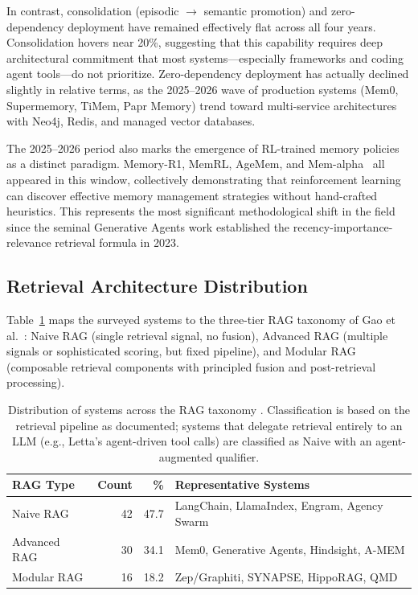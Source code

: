 In contrast, consolidation (episodic $\to$ semantic promotion) and
zero-dependency deployment have remained effectively flat across all four
years. Consolidation hovers near 20\%, suggesting that this capability
requires deep architectural commitment that most systems---especially
frameworks and coding agent tools---do not prioritize. Zero-dependency
deployment has actually declined slightly in relative terms, as the
2025--2026 wave of production systems (Mem0, Supermemory, TiMem, Papr
Memory) trend toward multi-service architectures with Neo4j, Redis, and
managed vector databases.

The 2025--2026 period also marks the emergence of RL-trained memory
policies as a distinct paradigm. Memory-R1, MemRL, AgeMem, and
Mem-alpha~\cite{wang2025memalpha} all appeared in this window, collectively
demonstrating that reinforcement learning can discover effective memory
management strategies without hand-crafted heuristics. This represents the
most significant methodological shift in the field since the seminal
Generative Agents work \cite{park2023generative} established the
recency-importance-relevance retrieval formula in 2023.

\subsection{Retrieval Architecture Distribution}
\label{sec:rag-distribution}

Table~\ref{tab:rag-distribution} maps the surveyed systems to the three-tier
RAG taxonomy of Gao et al.~\cite{gao2023rag}: Naive RAG (single retrieval
signal, no fusion), Advanced RAG (multiple signals or sophisticated
scoring, but fixed pipeline), and Modular RAG (composable retrieval
components with principled fusion and post-retrieval processing).

\begin{table}[!t]
\centering
\caption{Distribution of systems across the RAG taxonomy \cite{gao2023rag}. Classification is based on the retrieval pipeline as documented; systems that delegate retrieval entirely to an LLM (e.g., Letta's agent-driven tool calls) are classified as Naive with an agent-augmented qualifier.}
\label{tab:rag-distribution}
\small
\begin{tabular}{@{}lrrp{4.0cm}@{}}
\toprule
\textbf{RAG Type} & \textbf{Count} & \textbf{\%} & \textbf{Representative Systems} \\
\midrule
Naive RAG       & 42 & 47.7 & LangChain, LlamaIndex, Engram, Agency Swarm \\
Advanced RAG    & 30 & 34.1 & Mem0, Generative Agents, Hindsight, A-MEM \\
Modular RAG     & 16 & 18.2 & Zep/Graphiti, SYNAPSE, HippoRAG, QMD \\
\bottomrule
\end{tabular}
\end{table}

